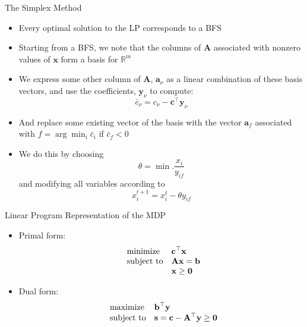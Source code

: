 \documentclass{beamer}
\renewcommand{\vec}[1]{\mathbf{#1}}
\begin{document}

\begin{frame}{The Simplex Method}
\begin{itemize}
  \item Every optimal solution to the LP corresponds to a BFS
  \item Starting from a BFS, we note that the columns of $\vec{A}$ associated with nonzero values of $\vec{x}$ form a basis for $\mathbb{R}^m$
  \item We express some other column of $\vec{A}$, $\vec{a}_{\nu}$ as a linear combination of these basis vectors, and use the coefficients, $\vec{y}_\nu$ to compute:
  $$\bar{c}_\nu = c_\nu - \vec{c}^\top\vec{y}_\nu$$
  \item And replace some existing vector of the basis with the vector $\vec{a}_f$ associated with $f = \arg\!\min_i\bar{c}_i$ if $\bar{c}_f < 0$
  \item We do this by choosing $$\theta = \min. \frac{x_i}{y_{if}}$$
  and modifying all variables according to
  $$x_i^{t+1} = x_i^{t} - \theta y_{if}$$

\end{itemize}
\end{frame}


\begin{frame}{Linear Program Representation of the MDP}
\begin{itemize}[<+->]
\item Primal form:
\begin{equation*}
\begin{array}{ll@{}ll}
\text{minimize}  & \displaystyle \vec{c}^\top\vec{x}\\
\text{subject to}& \displaystyle \vec{Ax}=\vec{b}\\
                         &  \displaystyle\vec{x}\geq\vec{0}
\end{array}
\end{equation*}

\item  Dual form:
\begin{equation*}
\begin{array}{ll@{}ll}
\text{maximize}  & \displaystyle \vec{b}^\top\vec{y}\\
\text{subject to}& \displaystyle \vec{s}=\vec{c}-\vec{A}^\top\vec{y}\geq \vec{0}
\end{array}
\end{equation*}
\end{itemize}
\end{frame}
\end{document}
